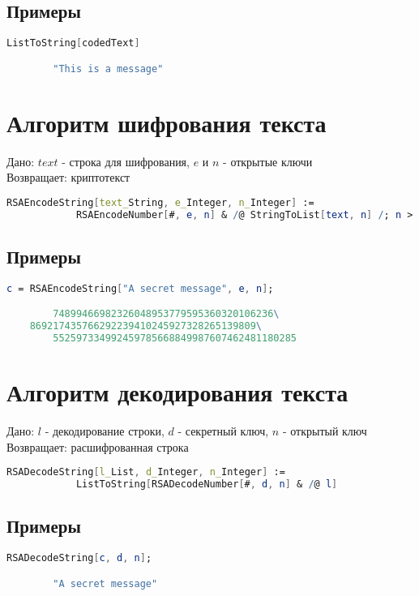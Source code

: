     	\subsection{Примеры}

    	\begin{lstlisting}[language=Mathematica,caption={
      		Пример	
    	}]
		ListToString[codedText]

		"This is a message"
    	\end{lstlisting}

	\section{Алгоритм шифрования текста}
		Дано: $text$ - строка для шифрования, $e$ и $n$ - открытые ключи \\
		Возвращает: криптотекст

		\begin{lstlisting}[language=Mathematica,caption={
      		Алгоритм шифрования текста
    	}]
		RSAEncodeString[text_String, e_Integer, n_Integer] := 
 			RSAEncodeNumber[#, e, n] & /@ StringToList[text, n] /; n > 256
    	\end{lstlisting}

    	\subsection{Примеры}

    	\begin{lstlisting}[language=Mathematica,caption={
      		Пример	
    	}]
		c = RSAEncodeString["A secret message", e, n];

		74899466982326048953779595360320106236\
    869217435766292239410245927328265139809\
		552597334992459785668849987607462481180285
    	\end{lstlisting}

	\section{Алгоритм декодирования текста}
		Дано: $l$ - декодирование строки, $d$ - секретный ключ, $n$ - открытый ключ \\
		Возвращает: расшифрованная строка

		\begin{lstlisting}[language=Mathematica,caption={
      		Алгоритм шифрования текста
    	}]
		RSADecodeString[l_List, d_Integer, n_Integer] := 
 			ListToString[RSADecodeNumber[#, d, n] & /@ l]
    	\end{lstlisting}

    	\subsection{Примеры}

    	\begin{lstlisting}[language=Mathematica,caption={
      		Пример	
    	}]
		RSADecodeString[c, d, n];

		"A secret message"
    	\end{lstlisting}

